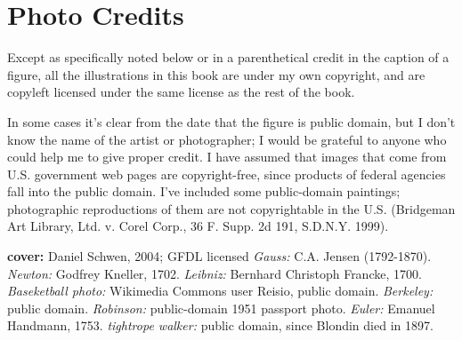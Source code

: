 \chapter{Photo Credits}

\footnotesize

Except as specifically noted below or in a parenthetical credit in the
caption of a figure, all the illustrations in this book are
under my own copyright, and are copyleft licensed under the same license
as the rest of the book. 

In some cases it's clear from the date that the
figure is public domain, but I don't know the name of the artist or photographer; I would
be grateful to anyone who could help me to give proper credit.
I have assumed that images
that come from U.S. government web pages are copyright-free, since products
of federal agencies fall into the public domain.
I've included some
public-domain paintings; photographic reproductions of them are not
copyrightable in the U.S. (Bridgeman Art Library, Ltd. v. Corel Corp.,
36 F. Supp. 2d 191, S.D.N.Y. 1999).

\begin{sloppypar}
\noindent

\newcommand{\photocredit}[1]{\footnotesize{(\textit{#1})}}%
\newcommand{\docred}[3]{\textbf{#1} \emph{#2:} #3.\quad}
\newcommand{\cred}[3]{\docred{\pageref{fig:#1}}{#2}{#3}}
\newcommand{\credtwo}[4]{\docred{\pageref{fig:#1},\pageref{fig:#2}}{#3}{#4}}
\newcommand{\credthree}[5]{\docred{\pageref{fig:#1},\pageref{fig:#2},\pageref{fig:#3}}{#4}{#5}}

\textbf{cover:} Daniel Schwen, 2004; GFDL licensed
\cred{gauss}{Gauss}{C.A. Jensen (1792-1870)}
\cred{newton}{Newton}{Godfrey Kneller, 1702}
\cred{leibniz}{Leibniz}{Bernhard Christoph Francke, 1700}
\cred{basketball}{Baseketball photo}{Wikimedia Commons user Reisio, public domain}
\cred{berkeley}{Berkeley}{public domain}
\cred{robinson}{Robinson}{public-domain 1951 passport photo}
\cred{euler}{Euler}{Emanuel Handmann, 1753}
\cred{blondin}{tightrope walker}{public domain, since Blondin died in 1897}

\end{sloppypar}\normalsize
